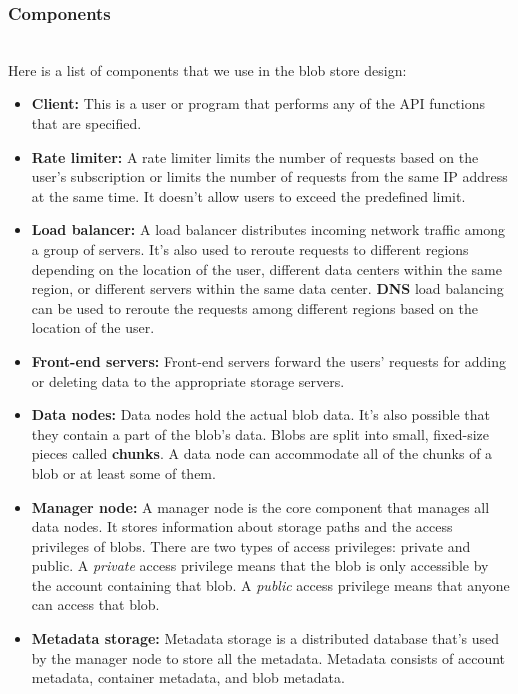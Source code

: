 \subsubsection{Components}\label{g09cVGuIIDaJNBUS6YSAK}
\\
Here is a list of components that we use in the blob store design:

\begin{itemize}
\item
\protect{}\label{r0axmnG0KhsirIh0As36g}
\textbf{Client:} This is a user or program that performs any of the API functions that are specified.
\item
\protect{}\label{S_iXIPvNNv_2BxZ3AEbzh}
\textbf{Rate limiter:} A rate limiter limits the number of requests based on the user's subscription or limits the number of requests from the same IP address at the same time. It doesn't allow users to exceed the predefined limit.
\item
\protect{}\label{zK2MHzZ6erXUA4DdB2K1C}
\textbf{Load balancer:} A load balancer distributes incoming network traffic among a group of servers. It's also used to reroute requests to different regions depending on the location of the user, different data centers within the same region, or different servers within the same data center. \textbf{DNS} load balancing can be used to reroute the requests among different regions based on the location of the user.
\item
\protect{}\label{h8c8k4TrWCPMUjJut55j4}
\textbf{Front-end servers:} Front-end servers forward the users' requests for adding or deleting data to the appropriate storage servers.
\item
\protect{}\label{YKbSzlx16jW7XnG1Zr6QL}
\textbf{Data nodes:} Data nodes hold the actual blob data. It's also possible that they contain a part of the blob's data. Blobs are split into small, fixed-size pieces called \textbf{chunks}. A data node can accommodate all of the chunks of a blob or at least some of them.
\item
\protect{}\label{7S3-Da-4h-U4Tc8bxCJWC}
\textbf{Manager node:} A manager node is the core component that manages all data nodes. It stores information about storage paths and the access privileges of blobs. There are two types of access privileges: private and public. A \emph{private} access privilege means that the blob is only accessible by the account containing that blob. A \emph{public} access privilege means that anyone can access that blob.
\item
\protect{}\label{-2Wv9ehSf8Od1phyhLn9M}
\textbf{Metadata storage:} Metadata storage is a distributed database that's used by the manager node to store all the metadata. Metadata consists of account metadata, container metadata, and blob metadata.


\end{itemize}
